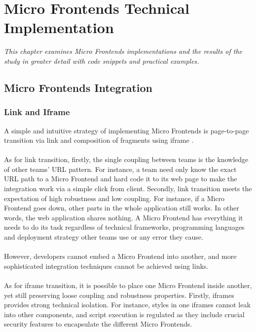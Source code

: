 \documentclass[a4paper]{book}
\begin{document}
\chapter{Micro Frontends Technical Implementation} \label{Micro Frontends Implementations}
\textit{This chapter examines Micro Frontends implementations and the results of the study in greater detail with code snippets and practical examples.}
\section{Micro Frontends Integration} 
\subsection{Link and Iframe}
A simple and intuitive strategy of implementing Micro Frontends is page-to-page transition via link and composition of fragments using iframe \cite{iframe}.
\\ \\
As for link transition, firstly, the single coupling between teams is the knowledge of other teams’ URL pattern. For instance, a team need only know the exact URL path to a Micro Frontend and hard code it to its web page to make the integration work via a simple click from client. Secondly, link transition meets the expectation of high robustness and low coupling. For instance, if a Micro Frontend goes down, other parts in the whole application still works. In other words, the web application shares nothing. A Micro Frontend has everything it needs to do its task regardless of technical frameworks, programming languages and deployment strategy other teams use or any error they cause.
\\ \\
However, developers cannot embed a Micro Frontend into another, and more sophisticated integration techniques cannot be achieved using links. 
\\ \\
As for iframe transition, it is possible to place one Micro Frontend inside another, yet still preserving loose coupling and robustness properties. Firstly, iframes provides strong technical isolation. For instance, styles in one iframes cannot leak into other components, and script execution is regulated as they include crucial security features to encapsulate the different Micro Frontends.
\\ \\
\end{document}

